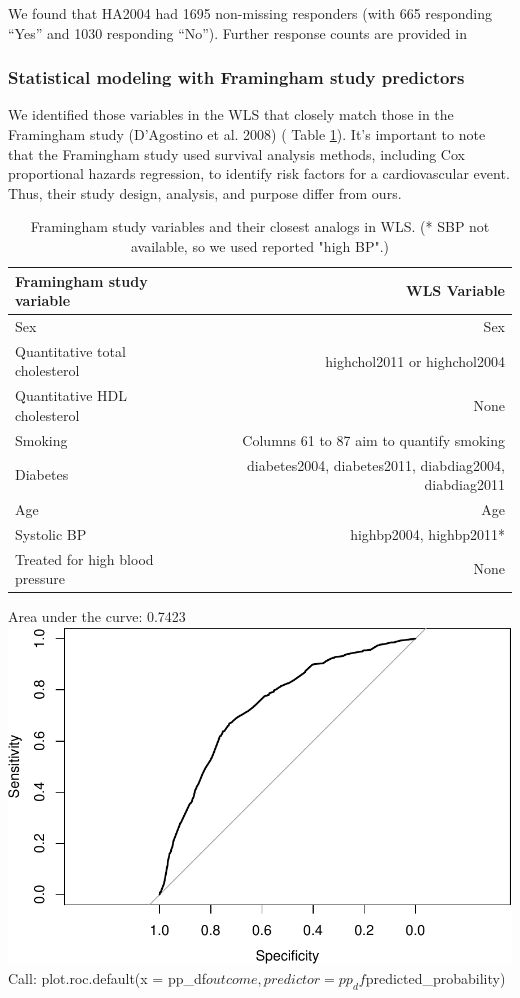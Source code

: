 \documentclass[11pt,]{article}
\begin{document}
We found that HA2004 had 1695 non-missing responders (with 665
responding ``Yes'' and 1030 responding ``No''). Further response counts
are provided in

\subsubsection{Statistical modeling with Framingham study
predictors}\label{statistical-modeling-with-framingham-study-predictors}

We identified those variables in the WLS that closely match those in the
Framingham study (D'Agostino et al. 2008) ( Table \ref{tab:fram2wls}).
It's important to note that the Framingham study used survival analysis
methods, including Cox proportional hazards regression, to identify risk
factors for a cardiovascular event. Thus, their study design, analysis,
and purpose differ from ours.

\begin{table}
\begin{tabular}{l r}\label{tab:fram2wls}
Framingham study variable & WLS Variable\\
\hline
Sex & Sex\\
Quantitative total cholesterol & highchol2011 or highchol2004\\
Quantitative HDL cholesterol & None\\
Smoking & Columns 61 to 87 aim to quantify smoking \\
Diabetes & diabetes2004, diabetes2011, diabdiag2004, diabdiag2011\\
Age & Age\\
Systolic BP & highbp2004, highbp2011* \\
Treated for high blood pressure & None\\
\hline
\end{tabular}
\caption{Framingham study variables and their closest analogs in WLS. (* SBP not available, so we used reported "high BP".)}
\end{table}

Area under the curve: 0.7423
\includegraphics{report2_files/figure-latex/pROC-1.pdf} Call:
plot.roc.default(x =
pp\_df\(outcome, predictor = pp_df\)predicted\_probability)
\end{document}
